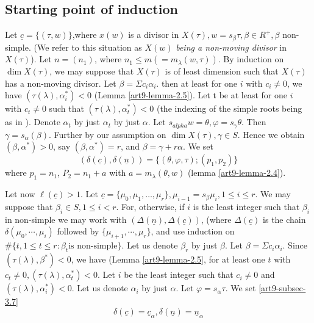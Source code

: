 \subsection*{Starting point of induction}
Let $\underline{c}=\{(\tau, w)\}$,where $x(w)$ is a divisor in $X(\tau),w = s_{\beta}\tau, \beta \in R^{+}, \beta$ non-simple. (We refer to this situation as $X(w)$ \textit{being a non-moving divisor} in $X(\tau)$). Let $n=(n_{1})$, where $n_{1} \leq m(=m_{\lambda}(w,\tau))$. By induction on $\dim X(\tau)$, we may suppose that $X(\tau)$ is of least dimension such that $X(\tau)$ has a non-moving divisor. Let $\beta =\Sigma c_{i}\alpha_{i}$. then at least for one $i$ with $c_{i}\neq 0$, we have $(\tau(\lambda), \alpha_{i}^{*}) < 0$ (Lemma \ref{art9-lemma-2.5}). Let t be at least for one $i$  with $c_{t}\neq 0$ such that $(\tau(\lambda), \alpha_{t}^{*})< 0$ (the indexing of the simple roots being as
in \cite{art9-keyB}). Denote $\alpha_{t}$ by just $\alpha_{t}$ by just $\alpha$. Let $s_{alpha}w = \theta, \varphi =s_{\gamma}\theta$. Then $\gamma = s_{\alpha}(\beta)$. Further by our assumption on $\dim X(\tau), \gamma \in S$. Hence we obtain $(\beta, \alpha^{*}) > 0$, say $(\beta, \alpha^{*})=r$, and $\beta = \gamma + r \alpha$. We set
$$
(\delta(\underline{c}), \delta(\underline{n}))=\{(\theta, \varphi, \tau); (p_{1},p_{2})\}
$$
where $p_{1}=n_{1}$, $P_{2}=n_{1}+a$ with $a=m_{\lambda}(\theta, w)$ (lemma \ref{art9-lemma-2.4}).

Let now $\ell(\underline{c}) > 1$. Let $\underline{c}= \{\mu_{0}, \mu_{1}, \ldots, \mu_{r}\}, \mu_{i-1} = s_{\beta}\mu_{i}, 1\leq i \leq r$. We may suppose that $\beta_{i} \in S, 1 \leq i < r$. For, otherwise, if $i$ is the least integer such that $\beta_{i}$ in non-simple we may work with $(\Delta(\underline{n}), \Delta(\underline{c}))$, (where   $\Delta(\underline{c})$ is the chain $\delta(\mu_{0},\cdots,\mu_{i})$ followed by $\{ \mu_{i+1}, \cdots, \mu_{r}\}$, and use induction on $\#\{t, 1\leq t \leq r : \beta_{t} \text{is non-simple}\}$. Let us denote $\beta_{r}$ by just $\beta$. Let $\beta =\Sigma c_{i}\alpha_{i}$. Since $(\tau(\lambda), \beta^{*}) < 0$, we have
(Lemma \ref{art9-lemma-2.5}, for at least one $t$ with $c_{t}\neq 0, (\tau(\lambda), \alpha_{t}^{*})< 0$. Let $i$ be the least integer such that $c_{i}\neq 0$ and $(\tau(\lambda), \alpha_{i}^{*}) < 0$. Let us denote $\alpha_{i}$ by just $\alpha$. Let  $\varphi= s_{\alpha}\tau$. We set \eqref{art9-subsec-3.7}
$$
\delta(\underline{c})= \underline{c}_{\alpha}, \delta(\underline{n}) = \underline{n}_{\alpha}
$$


